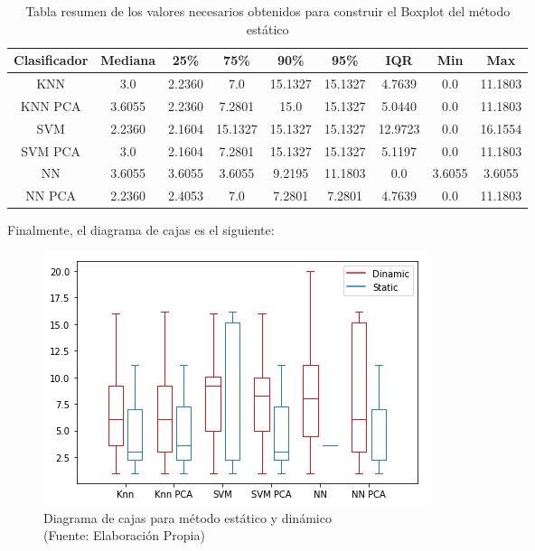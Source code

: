 \begin{table}[!ht]
\centering
\caption[Tabla Boxplot método estático]{Tabla resumen de los valores necesarios obtenidos para construir el Boxplot del método estático}
\label{tabla-boxplot-estatico}
\begin{tabular}{|c|c|c|c|c|c|c|c|c|}
\hline
\textbf{Clasificador} & \textbf{Mediana} & \textbf{25\%} & \textbf{75\%} & \textbf{90\%} & \textbf{95\%} & \textbf{IQR} & \textbf{Min} & \textbf{Max} \\ \hline
KNN                   & 3.0              & 2.2360        & 7.0           & 15.1327       & 15.1327       & 4.7639       & 0.0          & 11.1803      \\ \hline
KNN PCA               & 3.6055           & 2.2360        & 7.2801        & 15.0          & 15.1327       & 5.0440       & 0.0          & 11.1803      \\ \hline
SVM                   & 2.2360           & 2.1604        & 15.1327       & 15.1327       & 15.1327       & 12.9723      & 0.0          & 16.1554      \\ \hline
SVM PCA               & 3.0              & 2.1604        & 7.2801        & 15.1327       & 15.1327       & 5.1197      & 0.0          & 11.1803      \\ \hline
NN                    & 3.6055           & 3.6055        & 3.6055        & 9.2195        & 11.1803       & 0.0          & 3.6055       & 3.6055       \\ \hline
NN PCA                & 2.2360           & 2.4053        & 7.0           & 7.2801        & 7.2801        & 4.7639       & 0.0          & 11.1803      \\ \hline
\end{tabular}
\end{table}

Finalmente, el diagrama de cajas es el siguiente:

\begin{figure}[ht!]
\centering
\includegraphics[width=.6\textwidth]{figures/boxplot.png}
\caption[Diagrama de cajas para método estático y dinámico]{Diagrama de cajas para método estático y dinámico \\
{\scriptsize (Fuente: Elaboración Propia)}}
\label{fig:boxplot}
\end{figure}

